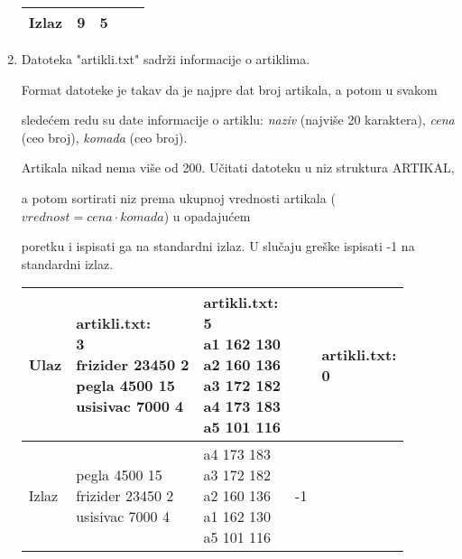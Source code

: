\begin{enumerate}
\begin{tabular}{ |l|l|l|l|l| }
  Izlaz &9 & 5 &  &  \\ \hline

\end{tabular}

\normalsize



\item Datoteka "artikli.txt" sadr\v zi informacije o artiklima.

Format datoteke je takav da je najpre dat broj artikala, a potom u svakom

slede\' cem redu su date informacije o artiklu: \emph{naziv} (najvi\v se 20 karaktera), \emph{cena} (ceo broj), \emph{komada} (ceo broj).

Artikala nikad nema vi\v se od 200. U\v citati datoteku u niz struktura ARTIKAL,

a potom sortirati niz prema ukupnoj vrednosti artikala ($vrednost = cena \cdot komada$) u opadaju\' cem

poretku i ispisati ga na standardni izlaz. U slu\v caju gre\v ske ispisati -1 na standardni izlaz.



\small

\begin{tabular}{ |l|l|l|l|l| }

\hline

  Ulaz &

  \mlcell{artikli.txt:\\3\\ frizider 23450 2\\ pegla 4500 15\\ usisivac 7000 4}&\mlcell{artikli.txt:\\5\\ a1 162 130\\ a2 160 136\\a3 172 182\\a4 173 183\\a5 101 116} & \mlcell{}&

  \mlcell{artikli.txt:\\0} \\ \hline

  Izlaz &\mlcell{pegla 4500 15\\frizider 23450 2\\usisivac 7000 4 }& \mlcell{a4 173 183\\a3 172 182\\ a2 160 136\\a1 162 130\\ a5 101 116} & -1 & \\ \hline

\end{tabular}

\normalsize

\end{enumerate}



